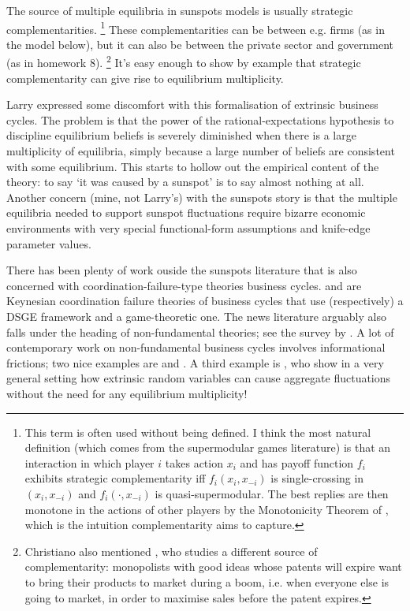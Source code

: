 \documentclass[11pt,letterpaper,reqno,oneside]{article}
\begin{document}
The source of multiple equilibria in sunspots models is usually strategic complementarities.%
	\footnote{This term is often used without being defined. I think the most natural definition (which comes from the supermodular games literature) is that an interaction in which player $i$ takes action $x_i$ and has payoff function $f_i$ exhibits strategic complementarity iff $f_i(x_i,x_{-i})$ is single-crossing in $(x_i,x_{-i})$ and $f_i(\cdot,x_{-i})$ is quasi-supermodular. The best replies are then monotone in the actions of other players by the Monotonicity Theorem of \textcite{MilgromShannon1994}, which is the intuition complementarity aims to capture.}
These complementarities can be between e.g. firms (as in the \textcite{ChristianoHarrison1999} model below), but it can also be between the private sector and government (as in homework 8).%
	\footnote{Christiano also mentioned \textcite{Shleifer1986}, who studies a different source of complementarity: monopolists with good ideas whose patents will expire want to bring their products to market during a boom, i.e. when everyone else is going to market, in order to maximise sales before the patent expires.}	
It's easy enough to show by example that strategic complementarity can give rise to equilibrium multiplicity.


Larry expressed some discomfort with this formalisation of extrinsic business cycles. The problem is that the power of the rational-expectations hypothesis to discipline equilibrium beliefs is severely diminished when there is a large multiplicity of equilibria, simply because a large number of beliefs are consistent with some equilibrium. This starts to hollow out the empirical content of the theory: to say `it was caused by a sunspot' is to say almost nothing at all. Another concern (mine, not Larry's) with the sunspots story is that the multiple equilibria needed to support sunspot fluctuations require bizarre economic environments with very special functional-form assumptions and knife-edge parameter values.


There has been plenty of work ouside the sunspots literature that is also concerned with coordination-failure-type theories business cycles. \textcite{Bryant1983,Bryant1987} and \textcite{CooperJohn1988} are Keynesian coordination failure theories of business cycles that use (respectively) a DSGE framework and a game-theoretic one. The news literature arguably also falls under the heading of non-fundamental theories; see the survey by \textcite{BeaudryPortier2014}. A lot of contemporary work on non-fundamental business cycles involves informational frictions; two nice examples are \textcite{MackowiakWiederholt2015} and \textcite{AngeletosLao2009}. A third example is \textcite{AngeletosLao2013}, who show in a very general setting how extrinsic random variables can cause aggregate fluctuations without the need for any equilibrium multiplicity!
\end{document}
